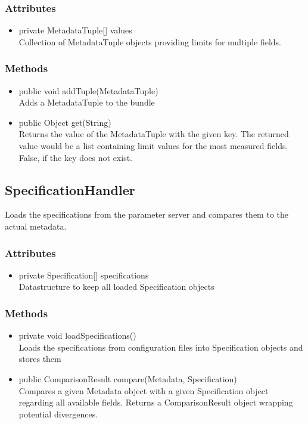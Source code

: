 \subsubsection{Attributes}
\begin{itemize}
	\item private  MetadataTuple[] values\\
	Collection of MetadataTuple objects providing limits for multiple fields.
\end{itemize}
\subsubsection{Methods}
\begin{itemize}
	\item public  void addTuple(MetadataTuple)\\
	Adds a MetadataTuple to the bundle
	\item public  Object get(String)\\
	Returns the value of the MetadataTuple with the given key. The returned value would be a list containing limit values for the most measured fields. False, if the key does not exist.
\end{itemize}


\subsection{SpecificationHandler}
Loads the specifications from the parameter server and compares them to the actual metadata.

\subsubsection{Attributes}
\begin{itemize}
	\item private  Specification[] specifications\\
	Datastructure to keep all loaded Specification objects
\end{itemize}
\subsubsection{Methods}
\begin{itemize}
	\item private  void loadSpecifications()\\
	Loads the specifications from configuration files into Specification objects and stores them
	\item public  ComparisonResult compare(Metadata, Specification)\\
	Compares a given Metadata object with a given Specification object regarding all available fields. Returns a ComparisonResult object wrapping potential divergences.
\end{itemize}


